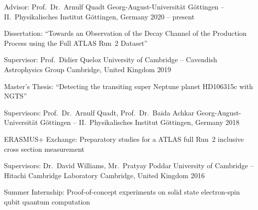 %
\begin{cventries}%
  \cventry%
    {Advisor: Prof.\ Dr.\ Arnulf Quadt} %
    {Georg-August-Universit\"at G\"ottingen -- II.\ Physikalisches Institut} %
    {G\"ottingen, Germany} %
    {2020 -- present} %
    {%
      \begin{cvitems} %
        \item {%
          Dissertation: ``Towards an Observation of the \Hbb Decay Channel of the \ttH Production Process\newline%
          using the Full ATLAS Run~2 Dataset''%
        }%
      \end{cvitems}%
    }%

  \cventry%
    {Supervisor: Prof.\ Didier Queloz} %
    {University of Cambridge -- Cavendish Astrophysics Group} %
    {Cambridge, United Kingdom} %
    {2019} %
    {%
      \begin{cvitems} %
        \item {Master's Thesis: ``Detecting the transiting super Neptune planet HD106315c with NGTS''}%
      \end{cvitems}%
    }%

  \cventry%
    {Supervisors: Prof.\ Dr.\ Arnulf Quadt, Prof.\ Dr.\ Baida Achkar} %
    {Georg-August-Universit\"at G\"ottingen -- II.\ Physikalisches Institut} %
    {G\"ottingen, Germany} %
    {2018} %
    {%
      \begin{cvitems} %
        \item {ERASMUS+ Exchange: Preparatory studies for a ATLAS full Run~2 \ttbar inclusive cross section measurement}%
      \end{cvitems}%
    }%

  \cventry%
    {Supervisors: Dr.\ David Williams, Mr.\ Pratyay Poddar} %
    {University of Cambridge -- Hitachi Cambridge Laboratory} %
    {Cambridge, United Kingdom} %
    {2016} %
    {%
      \begin{cvitems} %
        \item {Summer Internship: Proof-of-concept experiments on solid state electron-spin qubit quantum computation}%
      \end{cvitems}%
    }%
\end{cventries}%
